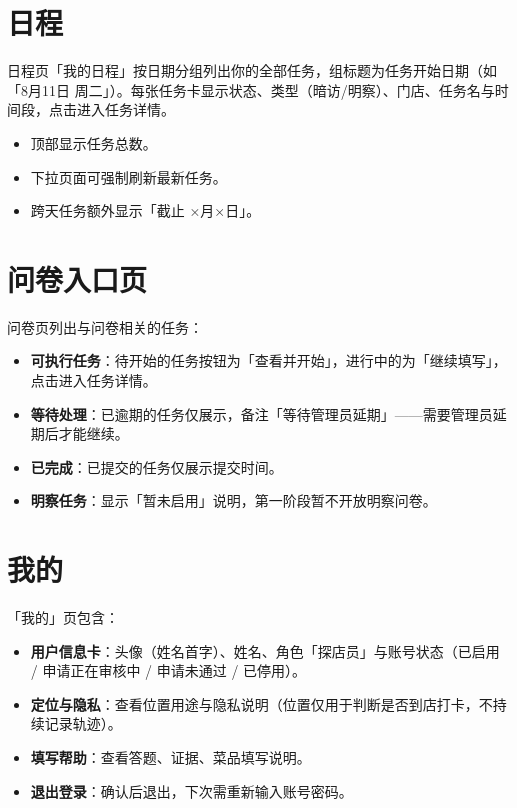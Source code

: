 \documentclass[12pt,a4paper,fontset=none]{ctexart}
\begin{document}
\section{日程}

日程页「我的日程」按日期分组列出你的全部任务，组标题为任务开始日期（如「8月11日 周二」）。每张任务卡显示状态、类型（暗访/明察）、门店、任务名与时间段，点击进入任务详情。

\begin{itemize}
\item 顶部显示任务总数。
\item 下拉页面可强制刷新最新任务。
\item 跨天任务额外显示「截止 ×月×日」。
\end{itemize}

\section{问卷入口页}

问卷页列出与问卷相关的任务：

\begin{itemize}
\item \textbf{可执行任务}：待开始的任务按钮为「查看并开始」，进行中的为「继续填写」，点击进入任务详情。
\item \textbf{等待处理}：已逾期的任务仅展示，备注「等待管理员延期」——需要管理员延期后才能继续。
\item \textbf{已完成}：已提交的任务仅展示提交时间。
\item \textbf{明察任务}：显示「暂未启用」说明，第一阶段暂不开放明察问卷。
\end{itemize}

\section{我的}

「我的」页包含：

\begin{itemize}
\item \textbf{用户信息卡}：头像（姓名首字）、姓名、角色「探店员」与账号状态（已启用 / 申请正在审核中 / 申请未通过 / 已停用）。
\item \textbf{定位与隐私}：查看位置用途与隐私说明（位置仅用于判断是否到店打卡，不持续记录轨迹）。
\item \textbf{填写帮助}：查看答题、证据、菜品填写说明。
\item \textbf{退出登录}：确认后退出，下次需重新输入账号密码。
\end{itemize}
\end{document}
